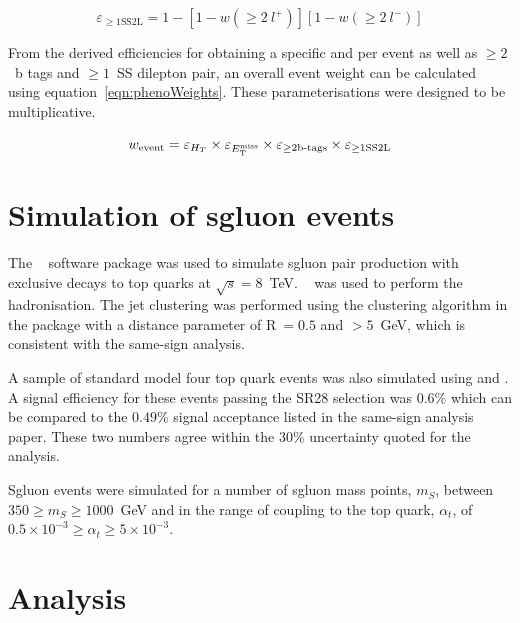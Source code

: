 \begin{equation}
\varepsilon_{\geq1 \text{SS2L}} = 1 - \left[1-w(\geq2~l^{+})\right]\left[1-w(\geq2~l^{-})\right]
\label{eqn:al1}
\end{equation}

From the derived efficiencies for obtaining a specific \HT and \MET per event as well as $\geq2$~b tags and $\geq1$~SS dilepton pair, an overall event weight can be calculated using equation~\ref{eqn:phenoWeights}. These parameterisations were designed to be multiplicative.

\begin{equation} \label{eqn:phenoWeights}
  w_{\rm event} = \varepsilon_{H_T} \times  \varepsilon_{E_{\mathrm{T}}^{\text{miss}}} \times
    \varepsilon_{\geq\text{2b-tags}} \times \varepsilon_{\geq1 \text{SS2L}} 
\end{equation}

\section{Simulation of sgluon events \label{sec:sgluonSim}}
The \MGfive~\cite{Alwall2014} software package was used to simulate sgluon pair production with exclusive decays to top quarks at $\sqrt{s}=8$~TeV. \PYTHIAsix~\cite{pythia} was used to perform the hadronisation. The jet clustering was performed using the \antikt clustering algorithm in the \FASTJET package with a distance parameter of R$~=0.5$ and \pt$>5$~GeV, which is consistent with the same-sign analysis.

A sample of standard model four top quark events was also simulated using \MGfive and \PYTHIAsix. A signal efficiency for these events passing the SR28 selection was $0.6\%$ which can be compared to the $0.49\%$ signal acceptance listed in the same-sign analysis paper. These two numbers agree within the $30\%$ uncertainty quoted for the analysis.

Sgluon events were simulated for a number of sgluon mass points, $m_{S}$, between $350 \geq m_{S} \geq 1000$~GeV and in the range of coupling to the top quark, $\alpha_{t}$, of $0.5 \times 10^{-3}\geq \alpha_{t} \geq 5 \times 10^{-3}$.

\section{Analysis \label{sec:sgluonAna}}

